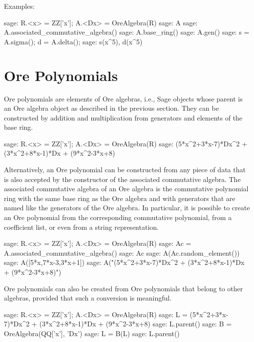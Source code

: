 \documentclass[11pt]{amsart}
\begin{document}
\smallskip\goodbreak

Examples: 

\begin{sageexample}
  sage: R.<x> = ZZ['x']; A.<Dx> = OreAlgebra(R)
  sage: A
  sage: A.associated_commutative_algebra()
  sage: A.base_ring()
  sage: A.gen()
  sage: s = A.sigma(); d = A.delta(); 
  sage: s(x^5), d(x^5)
\end{sageexample}

\section{Ore Polynomials}\label{sec:3}

Ore polynomials are elements of Ore algebras, i.e., Sage objects whose parent is an Ore algebra
object as described in the previous section. They can be constructed by addition and multiplication
from generators and elements of the base ring. 

\begin{sageexample}
  sage: R.<x> = ZZ['x']; A.<Dx> = OreAlgebra(R)
  sage: (5*x^2+3*x-7)*Dx^2 + (3*x^2+8*x-1)*Dx + (9*x^2-3*x+8)
\end{sageexample}

Alternatively, an Ore polynomial can be constructed from any piece of data that is also accepted
by the constructor of the associated commutative algebra. The associated commutative algebra of
an Ore algebra is the commutative polynomial ring with the same base ring as the Ore algebra 
and with generators that are named like the generators of the Ore algebra. In particular, it is
possible to create an Ore polynomial from the corresponding commutative polynomial, from a 
coefficient list, or even from a string representation.

\begin{sageexample}
  sage: R.<x> = ZZ['x']; A.<Dx> = OreAlgebra(R)
  sage: Ac = A.associated_commutative_algebra()
  sage: Ac
  sage: A(Ac.random_element())
  sage: A([5*x,7*x-3,3*x+1])
  sage: A("(5*x^2+3*x-7)*Dx^2 + (3*x^2+8*x-1)*Dx + (9*x^2-3*x+8)")
\end{sageexample}

Ore polynomials can also be created from Ore polynomials that belong to other algebras, provided
that such a conversion is meaningful. 

\begin{sageexample}
  sage: R.<x> = ZZ['x']; A.<Dx> = OreAlgebra(R)
  sage: L = (5*x^2+3*x-7)*Dx^2 + (3*x^2+8*x-1)*Dx + (9*x^2-3*x+8)
  sage: L.parent()
  sage: B = OreAlgebra(QQ['x'], 'Dx')
  sage: L = B(L)
  sage: L.parent()
\end{sageexample}
\end{document}
